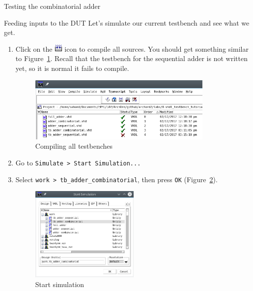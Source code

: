 \documentclass[lab]{course}
\begin{document}
\begin{section}{Testing the combinatorial adder}
\begin{subsection}{Feeding inputs to the DUT}
        Let's simulate our current testbench and see what we get.

        \begin{enumerate}
            \item Click on the \includegraphics[height=11pt]{figs/compile_all_icon.png} icon to compile all sources. You should get something similar to Figure~\ref{fig:compiling_with_combinatorial_testbench}. Recall that the testbench for the sequential adder is not written yet, so it is normal it fails to compile.

            \begin{figure}[!h]
                \begin{centering}
                    \includegraphics[width=0.85\textwidth]{figs/compiling_with_combinatorial_testbench.png}
                    \caption{Compiling all testbenches}
                    \label{fig:compiling_with_combinatorial_testbench}
                \end{centering}
            \end{figure}

            \item Go to \verb+Simulate > Start Simulation...+

            \item Select \verb+work > tb_adder_combinatorial+, then press \verb+OK+ (Figure~\ref{fig:start_tb_adder_combinatorial_simulation}).

            \begin{figure}[!h]
                \begin{centering}
                    \includegraphics[width=0.50\textwidth]{figs/start_tb_adder_combinatorial_simulation.png}
                    \caption{Start simulation}
                    \label{fig:start_tb_adder_combinatorial_simulation}
                \end{centering}
            \end{figure}


\end{enumerate}
\end{subsection}
\end{section}
\end{document}
